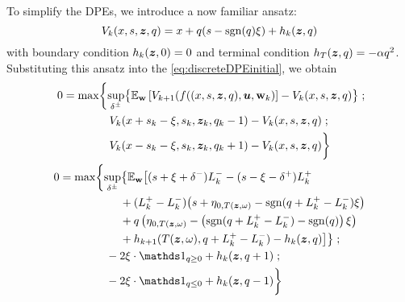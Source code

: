 To simplify the DPEs, we introduce a now familiar ansatz:
\begin{equation}
\label{eq:ansatzHdscr}
V_k (x,s,\bm{z},q) = x + q(s-\operatorname{\mathrm{sgn}}(q)\xi) + h_k(\bm{z},q)
\end{equation}
with boundary condition $h_k(\bm{z},0) = 0$ and terminal condition $h_T(\bm{z},q) = -\alpha q^2$. Substituting this ansatz into the \eqref{eq:discreteDPEinitial}, we obtain
\begin{align}
\begin{split}
0 & = \max \biggl\lbrace \sup_{\delta^\pm} \bigl\lbrace \E_{\bw} \left[ V_{k+1} (f((x,s,\bz,q),\bu,\bw_k) \right] - V_k (x,s,\bz,q) \bigr\rbrace \; ; \\
& \hphantom{{}={} \max \biggl\lbrace} V_k(x+s_k-\xi,s_k, \bz_k, q_k -1) - V_k (x,s,\bz,q)\; ; \\
& \hphantom{{}={} \max \biggl\lbrace} V_k(x-s_k-\xi,s_k, \bz_k, q_k +1) - V_k (x,s,\bz,q) \biggr\rbrace
\end{split} \\
\label{eq:discreteDPE}
\begin{split}
0 & = \max \biggl\lbrace 
\sup_{\delta^\pm} \bigl\lbrace \E_{\bw} \bigl[
(s + \xi + \delta^-)L_k^- - (s - \xi - \delta^+)L_k^+ \\
& \hphantom{\sup_{\bu} \biggl\lbrace \E_{\bw} \biggl[ {}+{}} + (L_k^+ - L_k^-) \bigl( s + \eta_{0,T(\bz, \omega)}  -\sgn( q + L_k^+ - L_k^-)\xi   \bigr) \\
& \hphantom{\sup_{\bu} \biggl\lbrace \E_{\bw} \biggl[ {}+{}} + q\left( \eta_{0,T(\bz, \omega)}  -\left( \sgn( q + L_k^+ - L_k^-) - \sgn(q) \right) \xi \right) \\
& \hphantom{\sup_{\bu} \biggl\lbrace \E_{\bw} \biggl[ {}+{}} + h_{k+1}(T(\bz,\omega), q + L_k^+ - L_k^- ) -  h_k(\bz,q) \bigr] \bigr\rbrace \; ;\\
& \hphantom{{}={} \max \biggl\lbrace } -2\xi \cdot \indicator_{q \geq 0} + h_k(\bz,q+1) \; ; \\
& \hphantom{{}={} \max \biggl\lbrace } -2\xi \cdot \indicator_{q \leq 0} + h_k(\bz,q-1) \biggr\rbrace
\end{split}
\end{align}

